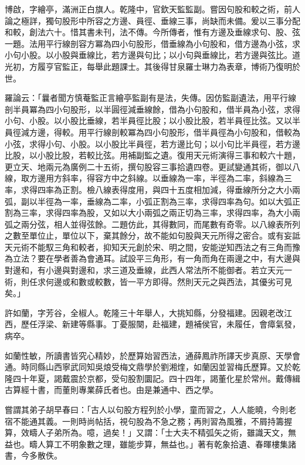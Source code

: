 \begin{pinyinscope}
博啟，字繪亭，滿洲正白旗人。乾隆中，官欽天監監副。嘗因句股和較之術，前人論之極詳，獨句股形中所容之方邊、員徑、垂線三事，尚缺而未備。爰以三事分配和較，創法六十。惜其書未刊，法不傳。今所傳者，惟有方邊及垂線求句、股、弦一題。法用平行線剖容方冪為四小句股形，借垂線為小句股和，借方邊為小弦，求小句小股。以小股與垂線比，若方邊與句比；以小句與垂線比，若方邊與弦比。道光初，方履亨官監正，每舉此題課士。其後得甘泉羅士琳力為表章，博術乃復明於世。

羅論云：「曩者聞方慎菴監正言繪亭監副有是法，失傳。因仿監副遺法，用平行線剖半員冪為四小句股形，以半圓徑減垂線餘，借為小句股和，借半員為小弦，求得小句、小股。以小股比垂線，若半員徑比股；以小股比股，若半員徑比弦。又以半員徑減方邊，得較。用平行線剖較冪為四小句股形，借半員徑為小句股和，借較為小弦，求得小句、小股。以小股比半員徑，若方邊比句；以小句比半員徑，若方邊比股，以小股比股，若較比弦。用補副監之遺。復用天元術演得三事和較六十題，更立天、地兩元為廣例二十五術，撰句股容三事拾遺四卷。更試變通其術，御以八線，取方邊用方斜率，得容方中之斜線。以垂線為一率，半徑為二率，斜線為三率，求得四率為正割。檢八線表得度用，與四十五度相加減，得垂線所分之大小兩弧，副以半徑為一率，垂線為二率，小弧正割為三率，求得四率為句。如以大弧正割為三率，求得四率為股，又如以大小兩弧之兩正切為三率，求得四率，為大小兩弧之兩分弦，相人並得弦餘。二題仿此，其得數同，而尾數有奇零。以八線表所列之數至單位止，單位以下，棄其餘分，故不能如句股與天元所得之密合。或有妄詆天元術不能馭三角和較者，抑知天元創於宋、明之間，安能逆知西法之有三角而豫為立法？要在學者善為會通耳。試設平三角形，有一角而角在兩邊之中，有大邊與對邊和，有小邊與對邊和，求三道及垂線，此西人常法所不能御者。若立天元一術，則任求何邊或和數或較數，皆一平方即得。然則天元之與西法，其優劣可見矣。」

許如蘭，字芳谷，全椒人。乾隆三十年舉人，大挑知縣，分發福建。因親老改江西，歷任浮梁、新建等縣事。丁憂服闋，赴福建，題補侯官，未履任，會瘴氣發，病卒。

如蘭性敏，所讀書皆究心精妙，於歷算始習西法，通薛鳳祚所譯天步真原、天學會通。時同縣山西寧武同知吳烺受梅文鼎學於劉湘煃，如蘭因並習梅氏歷算。又於乾隆四十年夏，謁戴震於京都，受句股割圜記。四十四年，謁董化星於常州。戴傳緝古算經十書，而董則專業薛氏者也。由是兼通中、西之學。

嘗謂其弟子胡早春曰：「古人以句股方程列於小學，童而習之，人人能曉，今則老宿不能通其義。一則時尚帖括，視句股為不急之務；再則習為風雅，不屑持籌握算，效疇人子弟所為。噫，過矣！」又謂：「士大夫不精弧矢之術，雖識天文，無益也。疇人算工不明象數之理，雖能步算，無益也。」著有乾象拾遺、春暉樓集諸書，今多散佚。


\end{pinyinscope}
